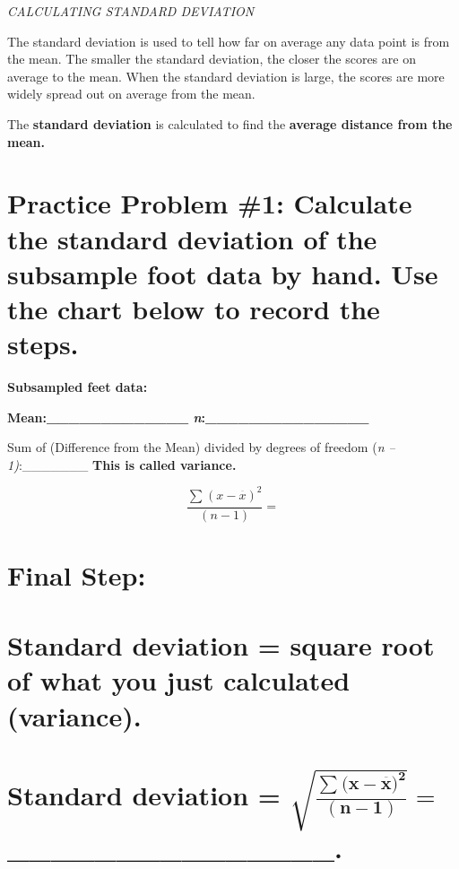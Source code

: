 \emph{CALCULATING STANDARD DEVIATION}

The standard deviation is used to tell how far on average any data point
is from the mean. The smaller the standard deviation, the closer the
scores are on average to the mean. When the standard deviation is large,
the scores are more widely spread out on average from the mean.

The \textbf{standard deviation} is calculated to find the
\textbf{average distance from the mean.}

\section{}\label{section}

\section{Practice Problem \#1: Calculate the standard deviation of the
subsample foot data by hand. Use the chart below to record the
steps.}\label{practice-problem-1-calculate-the-standard-deviation-of-the-subsample-foot-data-by-hand.-use-the-chart-below-to-record-the-steps.}

\textbf{Subsampled feet data:}

\textbf{Mean:\_\_\_\_\_\_\_\_\_\_\_\_\_
\emph{n}:\_\_\_\_\_\_\_\_\_\_\_\_\_\_\_}

Sum of (Difference from the Mean) divided by degrees of freedom (\emph{n
-- 1)}:\_\_\_\_\_\_\_ \textbf{This is called variance.}

\[\frac{{\sum_{}^{}{(x - \overset{\overline{}}{x})}}^{2}}{(n - 1)}\mathbf{=}\]

\section{Final Step:}\label{final-step}

\section{ Standard deviation = square root of what you just calculated
(variance).
}\label{standard-deviation-square-root-of-what-you-just-calculated-variance.}

\section{\texorpdfstring{Standard deviation =
\(\sqrt{\frac{{\sum_{}^{}{\mathbf{(x -}\overset{\overline{}}{\mathbf{x}}\mathbf{)}}}^{\mathbf{2}}}{\mathbf{(n - 1)}}}\mathbf{=}\)
\_\_\_\_\_\_\_\_\_\_\_\_\_\_\_.}{Standard deviation = \textbackslash{}sqrt\{\textbackslash{}frac\{\{\textbackslash{}sum\_\{\}\^{}\{\}\{\textbackslash{}mathbf\{(x -\}\textbackslash{}overset\{\textbackslash{}overline\{\}\}\{\textbackslash{}mathbf\{x\}\}\textbackslash{}mathbf\{)\}\}\}\^{}\{\textbackslash{}mathbf\{2\}\}\}\{\textbackslash{}mathbf\{(n - 1)\}\}\}\textbackslash{}mathbf\{=\} \_\_\_\_\_\_\_\_\_\_\_\_\_\_\_.}}\label{standard-deviation-sqrtfracsumux5fmathbfx--oversetoverlinemathbfxmathbfmathbf2mathbfn---1mathbf-ux5fux5fux5fux5fux5fux5fux5fux5fux5fux5fux5fux5fux5fux5fux5f.}

